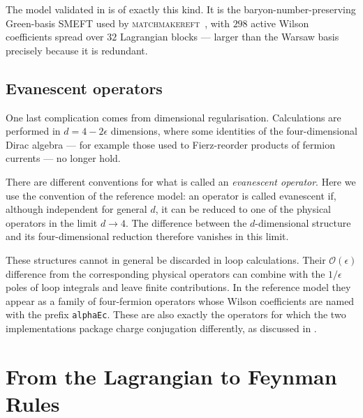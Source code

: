 The model validated in  is of exactly this kind. It is the
baryon-number-preserving Green-basis SMEFT used by
\textsc{matchmakereft}~\cite{Carmona:2021xtq}, with $298$ active Wilson
coefficients spread over $32$ Lagrangian blocks --- larger than the Warsaw
basis precisely because it is redundant.

\subsection{Evanescent operators}
\label{sec:theory-evanescent}

One last complication comes from dimensional regularisation. Calculations are
performed in $d = 4 - 2\epsilon$ dimensions, where some identities of the
four-dimensional Dirac algebra --- for example those used to Fierz-reorder
products of fermion currents --- no longer hold.

There are different conventions for what is called an \emph{evanescent
operator}. Here we use the convention of the reference model: an operator is
called evanescent if, although independent for general $d$, it can be reduced
to one of the physical operators in the limit $d\to4$. The difference between
the $d$-dimensional structure and its four-dimensional reduction therefore
vanishes in this limit.

These structures cannot in general be discarded in loop calculations. Their
$\mathcal{O}(\epsilon)$ difference from the corresponding physical operators
can combine with the $1/\epsilon$ poles of loop integrals and leave finite
contributions. In the reference model they appear as a family of four-fermion
operators whose Wilson coefficients are named with the prefix
\texttt{alphaEc}. These are also exactly the operators for which the two
implementations package charge conjugation differently, as discussed in
.


\section{From the Lagrangian to Feynman Rules}
\label{sec:feynrules-algorithm}

